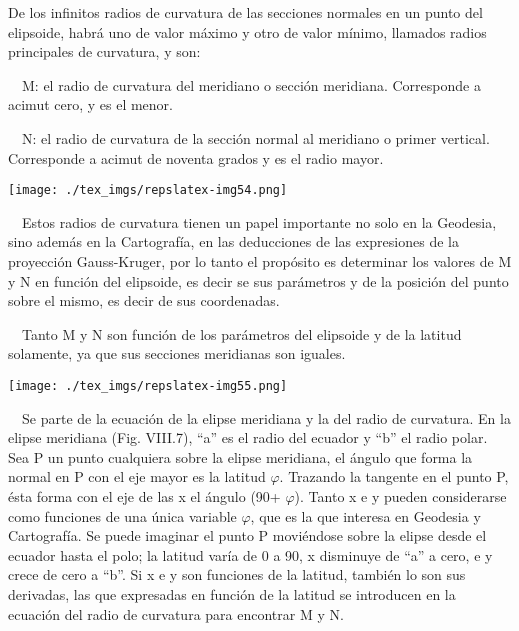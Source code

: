 \documentclass{tufte-book}
\begin{document}
De los infinitos radios de curvatura de las secciones normales en un
punto del elipsoide, habrá uno de valor máximo y otro de valor
mínimo, llamados radios principales de curvatura, y son:

\ \ M: el radio de curvatura del meridiano o sección meridiana.
Corresponde a acimut cero, y es el menor.

\ \ N: el radio de curvatura de la sección normal al meridiano o
primer vertical. Corresponde a acimut de noventa grados y es el radio
mayor.

\begin{marginfigure}
\texttt{[image: ./tex\_imgs/repslatex-img54.png]}
\end{marginfigure}
 

\ \ Estos radios de curvatura tienen un papel importante no solo en la
Geodesia,  sino además en la Cartografía, en las deducciones de las
expresiones de la proyección Gauss-Kruger, por lo tanto el
propósito es determinar los valores de M y N en función del
elipsoide, es decir se sus parámetros y de la posición del punto
sobre el mismo, es decir de sus coordenadas. 

\ \ Tanto M y N son función de los parámetros del elipsoide y de la
latitud solamente, ya que sus secciones meridianas son iguales.

\begin{marginfigure}
\texttt{[image: ./tex\_imgs/repslatex-img55.png]}
\end{marginfigure}
 

\ \ Se parte de la ecuación de la elipse meridiana y la del radio de
curvatura. En la elipse meridiana (Fig. VIII.7),
{\textquotedblleft}a{\textquotedblright} es el radio del ecuador y
{\textquotedblleft}b{\textquotedblright} el radio polar. Sea P un punto
cualquiera sobre la elipse meridiana, el ángulo que forma la normal
en P con el eje mayor es la latitud  ${\varphi }$. Trazando la tangente
en el punto P, ésta forma con el eje de las x el ángulo
(90{\textordmasculine}+ ${\varphi }$). Tanto x e y pueden considerarse
como funciones de una única variable  ${\varphi }$, que es la que
interesa en Geodesia y Cartografía. Se puede imaginar el punto P
moviéndose sobre la elipse desde el ecuador hasta el polo; la latitud
varía de 0 a 90{\textordmasculine}, x disminuye de
{\textquotedblleft}a{\textquotedblright} a cero, e y crece de cero a
{\textquotedblleft}b{\textquotedblright}. Si x e y son funciones de la
latitud, también lo son sus derivadas, las que expresadas en
función de la latitud se introducen en la ecuación del radio de
curvatura para encontrar M y N.
\end{document}

